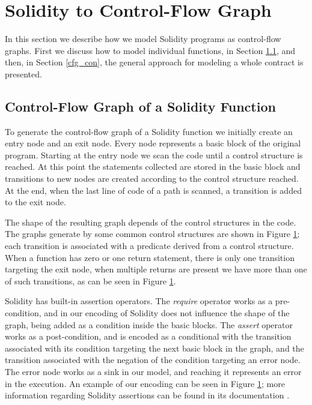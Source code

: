 \section{Solidity to Control-Flow Graph}

In this section we describe how we model Solidity programs as control-flow graphs. First we discuss how to model individual functions, in Section \ref{cfg_fun}, and then, in Section \ref{cfg_con}, the general approach for modeling a whole contract is presented.


\subsection{Control-Flow Graph of a Solidity Function} \label{cfg_fun}

To generate the control-flow graph of a Solidity function we initially create an entry node and an exit node. Every node represents a basic block of the original program. Starting at the entry node we scan the code until a control structure is reached. At this point the statements collected are stored in the basic block and transitions to new nodes are created according to the control structure reached. At the end, when the last line of code of a path is scanned, a transition is added to the exit node.

The shape of the resulting graph depends of the control structures in the code. The graphs generate by some common control structures are shown in Figure \ref{}; each transition is associated with a predicate derived from a control structure. When a function has zero or one return statement, there is only one transition targeting the exit node, when multiple returns are present we have more than one of such transitions, as can be seen in Figure \ref{}. 

Solidity has built-in assertion operators. The \textit{require} operator works as a pre-condition, and in our encoding of Solidity does not influence the shape of the graph, being added as a condition inside the basic blocks. The \textit{assert} operator works as a post-condition, and is encoded as a conditional with the transition associated with its condition targeting the next basic block in the graph, and the transition associated with the negation of the condition targeting an error node. The error node works as a sink in our model, and reaching it represents an error in the execution. An example of our encoding can be seen in Figure \ref{}; more information regarding Solidity assertions can be found in its documentation \cite{}.

